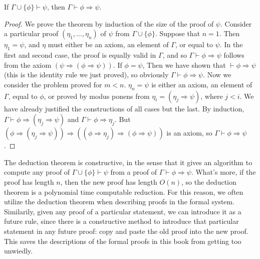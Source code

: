 \begin{theorem}
    If $\Gamma \cup \{ \phi \} \vdash \psi$, then $\Gamma \vdash \phi \Rightarrow \psi$.
\end{theorem}
\begin{proof}
    We prove the theorem by induction of the size of the proof of $\psi$. Consider a particular proof $(\eta_1, \dots, \eta_n)$ of $\psi$ from $\Gamma \cup \{ \phi \}$. Suppose that $n = 1$. Then $\eta_1 = \psi$, and $\eta$ must either be an axiom, an element of $\Gamma$, or equal to $\psi$. In the first and second case, the proof is equally valid in $\Gamma$, and so $\Gamma \vdash \phi \Rightarrow \psi$ follows from the axiom $(\psi \Rightarrow (\phi \Rightarrow \psi))$. If $\phi = \psi$, Then we have shown that $\vdash \phi \Rightarrow \psi$ (this is the identity rule we just proved), so obviously $\Gamma \vdash \phi \Rightarrow \psi$. Now we consider the problem proved for $m < n$. $\eta_n = \psi$ is either an axiom, an element of $\Gamma$, equal to $\phi$, or proved by modus ponens from $\eta_i = (\eta_j \Rightarrow \psi)$, where $j < i$. We have already justified the constructions of all cases but the last. By induction, $\Gamma \vdash \phi \Rightarrow (\eta_j \Rightarrow \psi)$ and $\Gamma \vdash \phi \Rightarrow \eta_j$. But $(\phi \Rightarrow (\eta_j \Rightarrow \psi)) \Rightarrow ((\phi \Rightarrow \eta_j) \Rightarrow (\phi \Rightarrow \psi))$ is an axiom, so $\Gamma \vdash \phi \Rightarrow \psi$.
\end{proof}

The deduction theorem is constructive, in the sense that it gives an algorithm to compute any proof of $\Gamma \cup \{ \phi \} \vdash \psi$ from a proof of $\Gamma \vdash \phi \Rightarrow \psi$. What's more, if the proof has length $n$, then the new proof has length $O(n)$, so the deduction theorem is a polynomial time computable reduction. For this reason, we often utilize the deduction theorem when describing proofs in the formal system. Similarily, given any proof of a particular statement, we can introduce it as a future rule, since there is a constructive method to introduce that particular statement in any future proof: copy and paste the old proof into the new proof. This saves the descriptions of the formal proofs in this book from getting too unwiedly.

